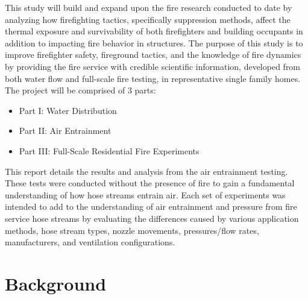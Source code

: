 \documentclass[12pt,oneside]{book}
\begin{document}
\vspace*{\baselineskip}

This study will build and expand upon the fire research conducted to date by analyzing how firefighting tactics, specifically suppression methods, affect the thermal exposure and survivability of both firefighters and building occupants in addition to impacting fire behavior in structures. The purpose of this study is to improve firefighter safety, fireground tactics, and the knowledge of fire dynamics by providing the fire service with credible scientific information, developed from both water flow and full-scale fire testing, in representative single family homes. The project will be comprised of 3 parts:
\vspace*{\baselineskip}
\begin{itemize}
	\item Part I:  Water Distribution
	\item Part II: Air Entrainment
	\item Part III: Full-Scale Residential Fire Experiments
	\end{itemize}
\vspace*{\baselineskip}

This report details the results and analysis from the air entrainment testing. These tests were conducted without the presence of fire to gain a fundamental understanding of how hose streams entrain air. Each set of experiments was intended to add to the understanding of air entrainment and pressure from fire service hose streams by evaluating the differences caused by various application methods, hose stream types, nozzle movements, pressures/flow rates, manufacturers, and ventilation configurations.




\newpage

\chapter{Background}
\end{document}
